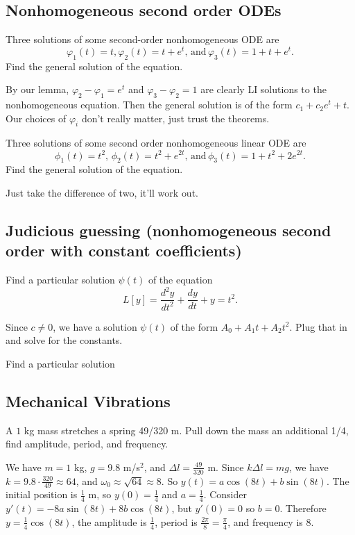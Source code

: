 \subsection{Nonhomogeneous second order ODEs}
\begin{prob}
    Three solutions of some second-order nonhomogeneous ODE are \[
        \varphi_1 (t)=t, \varphi_2(t)=t+e^{t},\,\text{and}\, \varphi_3(t)=1+t+e^{t}.  
    \] Find the general solution of the equation.
\end{prob}
\begin{solution}
    By our lemma, $\varphi_2-\varphi_1=e^{t}  $ and $\varphi_3-\varphi_2=1  $ are clearly LI solutions to the nonhomogeneous equation. Then the general solution is of the form $c_1+c_2e^{t}+t$. Our choices of $\varphi_i $ don't really matter, just trust the theorems.
\end{solution}
\begin{prob}
    Three solutions of some second order nonhomogeneous linear ODE are \[
        \phi_1(t)=t^2,\,\phi_2(t)=t^2+e^{2t},\,\text{and}\,\phi_3(t)=1+t^2+2e^{2t}.
    \] Find the general solution of the equation.
\end{prob}
\begin{solution}
    Just take the difference of two, it'll work out.
\end{solution}
\subsection{Judicious guessing (nonhomogeneous second order with constant coefficients)}
\begin{prob}
    Find a particular solution $\psi(t)$ of the equation \[
        L[y]=\frac{d^2y}{dt^2}+\frac{dy}{dt}+y=t^2.
    \] 
\end{prob}
\begin{solution}
    Since $c\neq 0$, we have a solution $\psi(t)$ of the form $A_0+A_1t+A_2t^2$. Plug that in and solve for the constants.
\end{solution}
\begin{prob}
    Find a particular solution 
\end{prob}
\subsection{Mechanical Vibrations}
\begin{prob}
    A $1$ kg mass stretches a spring 49/320 m. Pull down the mass an additional 1/4, find amplitude, period, and frequency.
\end{prob}
\begin{solution}
    We have $m=1$ kg, $g=9.8$ m/s$^2$, and $\Delta l=\frac{49}{320}$ m. Since $k \Delta l=mg$, we have $k=9.8 \cdot \frac{320}{49}\approx 64$, and $\omega_0\approx \sqrt{64} \approx 8$. So $y(t)=a \cos (8t)+b \sin (8t)$. The initial position is $\frac{1}{4}$ m, so $y(0)=\frac{1}{4}$ and $a=\frac{1}{4}$. Consider $y'(t)=-8a \sin(8t)+8b \cos (8t)$, but $y'(0)=0$ so $b=0$. Therefore $y=\frac{1}{4}\cos (8t)$, the amplitude is $\frac{1}{4}$, period is $\frac{2\pi}{8}=\frac{\pi}{4}$, and frequency is 8.
\end{solution}

